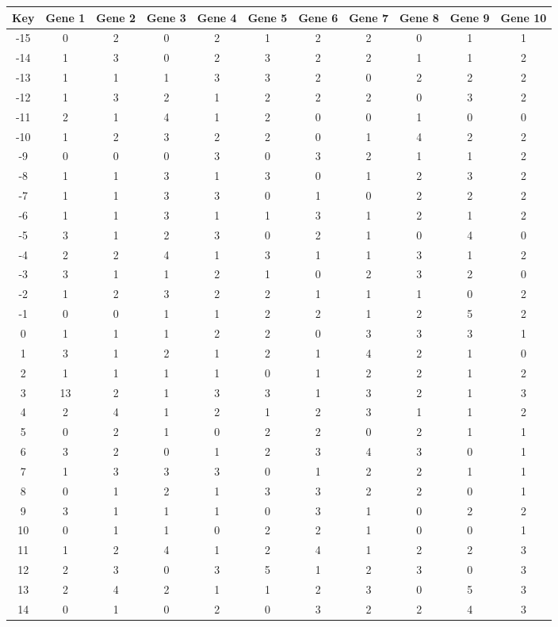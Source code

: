 \begin{tabular}{|c|c|c|c|c|c|c|c|c|c|c|}
\hline
Key & Gene 1 & Gene 2 & Gene 3 & Gene 4 & Gene 5 & Gene 6 & Gene 7 & Gene 8 & Gene 9 & Gene 10 \\
\hline
-15 & 0 & 2 & 0 & 2 & 1 & 2 & 2 & 0 & 1 & 1 \\
-14 & 1 & 3 & 0 & 2 & 3 & 2 & 2 & 1 & 1 & 2 \\
-13 & 1 & 1 & 1 & 3 & 3 & 2 & 0 & 2 & 2 & 2 \\
-12 & 1 & 3 & 2 & 1 & 2 & 2 & 2 & 0 & 3 & 2 \\
-11 & 2 & 1 & 4 & 1 & 2 & 0 & 0 & 1 & 0 & 0 \\
-10 & 1 & 2 & 3 & 2 & 2 & 0 & 1 & 4 & 2 & 2 \\
-9 & 0 & 0 & 0 & 3 & 0 & 3 & 2 & 1 & 1 & 2 \\
-8 & 1 & 1 & 3 & 1 & 3 & 0 & 1 & 2 & 3 & 2 \\
-7 & 1 & 1 & 3 & 3 & 0 & 1 & 0 & 2 & 2 & 2 \\
-6 & 1 & 1 & 3 & 1 & 1 & 3 & 1 & 2 & 1 & 2 \\
-5 & 3 & 1 & 2 & 3 & 0 & 2 & 1 & 0 & 4 & 0 \\
-4 & 2 & 2 & 4 & 1 & 3 & 1 & 1 & 3 & 1 & 2 \\
-3 & 3 & 1 & 1 & 2 & 1 & 0 & 2 & 3 & 2 & 0 \\
-2 & 1 & 2 & 3 & 2 & 2 & 1 & 1 & 1 & 0 & 2 \\
-1 & 0 & 0 & 1 & 1 & 2 & 2 & 1 & 2 & 5 & 2 \\
0 & 1 & 1 & 1 & 2 & 2 & 0 & 3 & 3 & 3 & 1 \\
1 & 3 & 1 & 2 & 1 & 2 & 1 & 4 & 2 & 1 & 0 \\
2 & 1 & 1 & 1 & 1 & 0 & 1 & 2 & 2 & 1 & 2 \\
3 & 13 & 2 & 1 & 3 & 3 & 1 & 3 & 2 & 1 & 3 \\
4 & 2 & 4 & 1 & 2 & 1 & 2 & 3 & 1 & 1 & 2 \\
5 & 0 & 2 & 1 & 0 & 2 & 2 & 0 & 2 & 1 & 1 \\
6 & 3 & 2 & 0 & 1 & 2 & 3 & 4 & 3 & 0 & 1 \\
7 & 1 & 3 & 3 & 3 & 0 & 1 & 2 & 2 & 1 & 1 \\
8 & 0 & 1 & 2 & 1 & 3 & 3 & 2 & 2 & 0 & 1 \\
9 & 3 & 1 & 1 & 1 & 0 & 3 & 1 & 0 & 2 & 2 \\
10 & 0 & 1 & 1 & 0 & 2 & 2 & 1 & 0 & 0 & 1 \\
11 & 1 & 2 & 4 & 1 & 2 & 4 & 1 & 2 & 2 & 3 \\
12 & 2 & 3 & 0 & 3 & 5 & 1 & 2 & 3 & 0 & 3 \\
13 & 2 & 4 & 2 & 1 & 1 & 2 & 3 & 0 & 5 & 3 \\
14 & 0 & 1 & 0 & 2 & 0 & 3 & 2 & 2 & 4 & 3 \\
\hline
\end{tabular}